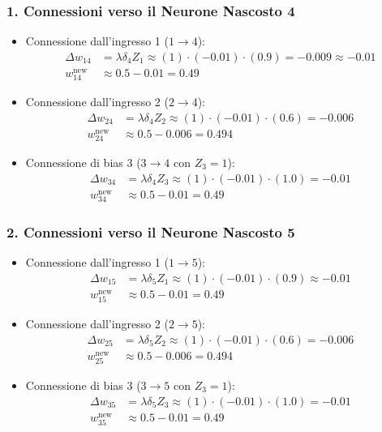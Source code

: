 \subsubsection{1. Connessioni verso il Neurone Nascosto 4}
\begin{itemize}
    \item Connessione dall'ingresso 1 ($1 \to 4$):
    \begin{align}
        \Delta w_{14} &= \lambda \delta_4 Z_1 \approx (1) \cdot (-0.01) \cdot (0.9) = -0.009 \approx \mathbf{-0.01} \nonumber \\
        w_{14}^{\text{new}} &\approx 0.5 - 0.01 = \mathbf{0.49}
    \end{align}
    \item Connessione dall'ingresso 2 ($2 \to 4$):
    \begin{align}
        \Delta w_{24} &= \lambda \delta_4 Z_2 \approx (1) \cdot (-0.01) \cdot (0.6) = -0.006 \nonumber \\
        w_{24}^{\text{new}} &\approx 0.5 - 0.006 = \mathbf{0.494}
    \end{align}
    \item Connessione di bias 3 ($3 \to 4$ con $Z_3 = 1$):
    \begin{align}
        \Delta w_{34} &= \lambda \delta_4 Z_3 \approx (1) \cdot (-0.01) \cdot (1.0) = \mathbf{-0.01} \nonumber \\
        w_{34}^{\text{new}} &\approx 0.5 - 0.01 = \mathbf{0.49}
    \end{align}
\end{itemize}

\subsubsection{2. Connessioni verso il Neurone Nascosto 5}
\begin{itemize}
    \item Connessione dall'ingresso 1 ($1 \to 5$):
    \begin{align}
        \Delta w_{15} &= \lambda \delta_5 Z_1 \approx (1) \cdot (-0.01) \cdot (0.9) \approx \mathbf{-0.01} \nonumber \\
        w_{15}^{\text{new}} &\approx 0.5 - 0.01 = \mathbf{0.49}
    \end{align}
    \item Connessione dall'ingresso 2 ($2 \to 5$):
    \begin{align}
        \Delta w_{25} &= \lambda \delta_5 Z_2 \approx (1) \cdot (-0.01) \cdot (0.6) = -0.006 \nonumber \\
        w_{25}^{\text{new}} &\approx 0.5 - 0.006 = \mathbf{0.494}
    \end{align}
    \item Connessione di bias 3 ($3 \to 5$ con $Z_3 = 1$):
    \begin{align}
        \Delta w_{35} &= \lambda \delta_5 Z_3 \approx (1) \cdot (-0.01) \cdot (1.0) = \mathbf{-0.01} \nonumber \\
        w_{35}^{\text{new}} &\approx 0.5 - 0.01 = \mathbf{0.49}
    \end{align}
\end{itemize}

